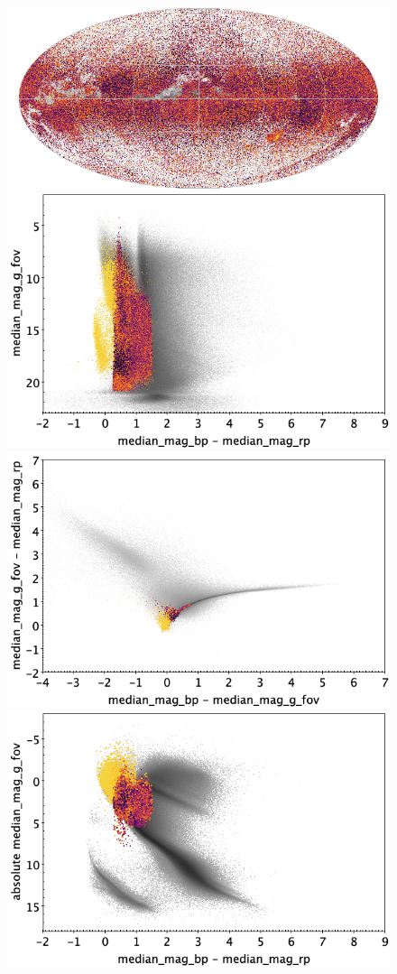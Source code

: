 \documentclass[longauth]{aa}
\begin{document}
\begin{appendix}
\begin{figure}
\centering
{}
\includegraphics[width=0.6\hsize]{figures/appendix/DSCT_cls_sky.png} 
 \\ %
\vspace{4mm}
 \includegraphics[width=0.45\hsize]{figures/appendix/DSCT_cls_cm.png}  %
\hspace{2mm}
 \includegraphics[width=0.45\hsize]{figures/appendix/DSCT_cls_cc.png} \\ %
\vspace{4mm}
 \includegraphics[width=0.45\hsize]{figures/appendix/DSCT_cls_cam.png}  %

\end{figure}
\end{appendix}
\end{document}
